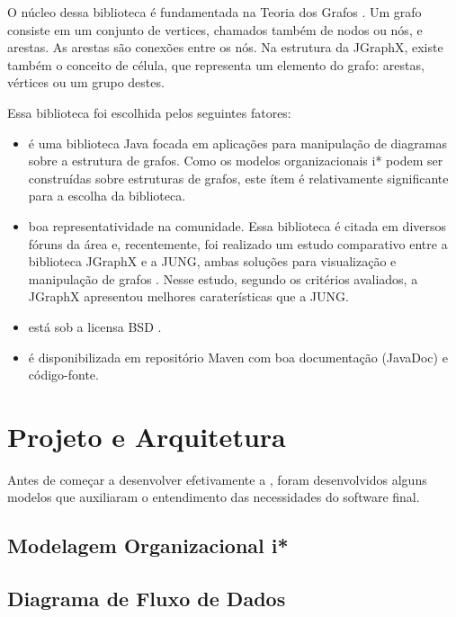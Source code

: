             O núcleo dessa biblioteca é fundamentada na Teoria dos Grafos \cite{teoria dos grafos}.
                Um grafo consiste em um conjunto de vertices, chamados também de nodos ou nós, e arestas.
                As arestas são conexões entre os nós.
                Na estrutura da JGraphX, existe também o conceito de célula, que representa um elemento do grafo: arestas, vértices ou um grupo destes.

                Essa biblioteca foi escolhida pelos seguintes fatores:
                    \begin{itemize}
                        \item é uma biblioteca Java focada em aplicações para manipulação de diagramas sobre a estrutura de grafos. Como os modelos organizacionais i* podem ser construídas sobre estruturas de grafos, este ítem é relativamente significante para a escolha da biblioteca.
                        \item boa representatividade na comunidade. Essa biblioteca é citada em diversos fóruns da área e, recentemente, foi realizado um estudo comparativo entre a biblioteca JGraphX e a JUNG, ambas soluções para visualização e manipulação de grafos \cite{souza2013analise}. Nesse estudo, segundo os critérios avaliados, a JGraphX apresentou melhores caraterísticas que a JUNG.
                        \item está sob a licensa BSD \cite{bsd}.
                        \item é disponibilizada em repositório Maven com boa documentação (JavaDoc) e código-fonte.
                    \end{itemize}

    \section{Projeto e Arquitetura}
        \label{cap:proposta-sec:design}
            Antes de começar a desenvolver efetivamente a \ferramenta{},
                foram desenvolvidos alguns modelos que auxiliaram o entendimento das necessidades do software final.

        \subsection{Modelagem Organizacional i*}
        \subsection{Diagrama de Fluxo de Dados}

